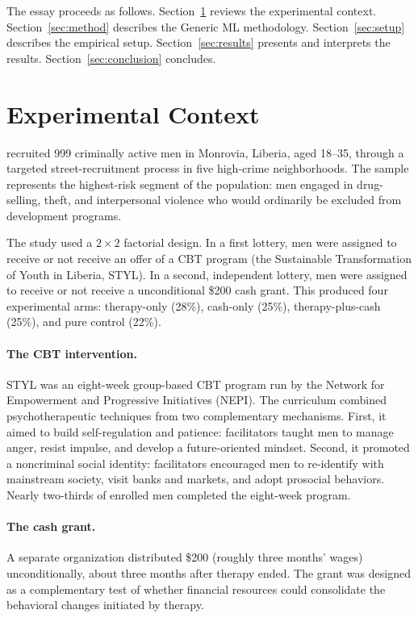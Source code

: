 \documentclass[11pt]{article}
\begin{document}
The essay proceeds as follows. Section~\ref{sec:blattman} reviews the
experimental context. Section~\ref{sec:method} describes the Generic ML
methodology. Section~\ref{sec:setup} describes the empirical setup.
Section~\ref{sec:results} presents and interprets the results.
Section~\ref{sec:conclusion} concludes.

\section{Experimental Context}
\label{sec:blattman}

\citet{blattman2017} recruited 999 criminally active men in Monrovia, Liberia,
aged 18--35, through a targeted street-recruitment process in five high-crime
neighborhoods. The sample represents the highest-risk segment of the
population: men engaged in drug-selling, theft, and interpersonal violence who
would ordinarily be excluded from development programs.

The study used a $2\times 2$ factorial design. In a first lottery, men were
assigned to receive or not receive an offer of a CBT program (the Sustainable Transformation
of Youth in Liberia, STYL). In a second, independent lottery, men
were assigned to receive or not receive a unconditional \$200 cash grant. This produced four
experimental arms: therapy-only (28\%), cash-only (25\%), therapy-plus-cash
(25\%), and pure control (22\%).

\paragraph{The CBT intervention.}
STYL was an eight-week group-based CBT program run by the Network for
Empowerment and Progressive Initiatives (NEPI). The curriculum combined
psychotherapeutic techniques from two complementary mechanisms. First, it
aimed to build self-regulation and patience: facilitators taught men to manage
anger, resist impulse, and develop a future-oriented mindset. Second, it
promoted a noncriminal social identity: facilitators encouraged men to
re-identify with mainstream society, visit banks and markets, and adopt
prosocial behaviors. Nearly two-thirds of enrolled men completed the
eight-week program.

\paragraph{The cash grant.}
A separate organization distributed \$200 (roughly three months' wages)
unconditionally, about three months after therapy ended. The grant was
designed as a complementary test of whether financial resources could
consolidate the behavioral changes initiated by therapy.
\end{document}
